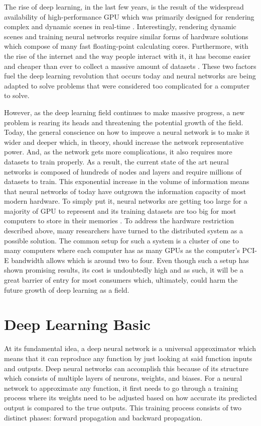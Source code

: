 \documentclass{IEEEtran}
\begin{document}
        The rise of deep learning, in the last few years, is the result of the widespread availability of high-performance GPU which was primarily designed for rendering complex and dynamic scenes in real-time \cite{nickolls_dally_2010}. Interestingly, rendering dynamic scenes and training neural networks require similar forms of hardware solutions which compose of many fast floating-point calculating cores. Furthermore, with the rise of the internet and the way people interact with it, it has become easier and cheaper than ever to collect a massive amount of datasets \cite{deng_dong_socher_li_li_fei-fei_2009}. These two factors fuel the deep learning revolution that occurs today and neural networks are being adapted to solve problems that were considered too complicated for a computer to solve.

        However, as the deep learning field continues to make massive progress, a new problem is rearing its heads and threatening the potential growth of the field. Today, the general conscience on how to improve a neural network is to make it wider and deeper which, in theory, should increase the network representative power. And, as the network gets more complications, it also requires more datasets to train properly. As a result, the current state of the art neural networks is composed of hundreds of nodes and layers and require millions of datasets to train. This exponential increase in the volume of information means that neural networks of today have outgrown the information capacity of most modern hardware. To simply put it, neural networks are getting too large for a majority of GPU to represent and its training datasets are too big for most computers to store in their memories \cite{ben-nun_hoefler_2019}. To address the hardware restriction described above, many researchers have turned to the distributed system as a possible solution. The common setup for such a system is a cluster of one to many computers where each computer has as many GPUs as the computer's PCI-E bandwidth allows which is around two to four.  Even though such a setup has shown promising results, its cost is undoubtedly high and as such, it will be a great barrier of entry for most consumers which, ultimately, could harm the future growth of deep learning as a field. 

    \section{Deep Learning Basic}
        At its fundamental idea, a deep neural network is a universal approximator which means that it can reproduce any function by just looking at said function inputs and outputs. Deep neural networks can accomplish this because of its structure which consists of multiple layers of neurons, weights, and biases\cite{hornik_1991}. For a neural network to approximate any function, it first needs to go through a training process where its weights need to be adjusted based on how accurate its predicted output is compared to the true outputs. This training process consists of two distinct phases: forward propagation and backward propagation. 
\end{document}
